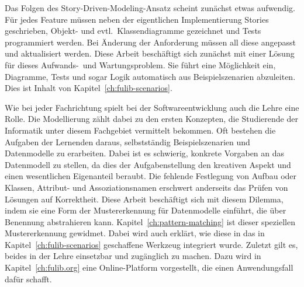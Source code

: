 Das Folgen des Story-Driven-Modeling-Ansatz scheint zunächst etwas aufwendig.
Für jedes Feature müssen neben der eigentlichen Implementierung Stories geschrieben, Objekt- und evtl.\ Klassendiagramme gezeichnet und Tests programmiert werden.
Bei Änderung der Anforderung müssen all diese angepasst und aktualisiert werden.
Diese Arbeit beschäftigt sich zunächst mit einer Lösung für dieses Aufwands-\ und Wartungsproblem.
Sie führt eine Möglichkeit ein, Diagramme, Tests und sogar Logik automatisch aus Beispielszenarien abzuleiten.
Dies ist Inhalt von Kapitel~\ref{ch:fulib-scenarios}.

Wie bei jeder Fachrichtung spielt bei der Softwareentwicklung auch die Lehre eine Rolle.
Die Modellierung zählt dabei zu den ersten Konzepten, die Studierende der Informatik unter diesem Fachgebiet vermittelt bekommen.
Oft bestehen die Aufgaben der Lernenden daraus, selbstständig Beispielszenarien und Datenmodelle zu erarbeiten.
Dabei ist es schwierig, konkrete Vorgaben an das Datenmodell zu stellen, da dies der Aufgabenstellung den kreativen Aspekt und einen wesentlichen Eigenanteil beraubt.
Die fehlende Festlegung von Aufbau oder Klassen, Attribut- und Assoziationsnamen erschwert anderseits das Prüfen von Lösungen auf Korrektheit.
Diese Arbeit beschäftigt sich mit diesem Dilemma, indem sie eine Form der Mustererkennung für Datenmodelle einführt, die über Benennung abstrahieren kann.
Kapitel~\ref{ch:pattern-matching} ist dieser speziellen Mustererkennung gewidmet.
Dabei wird auch erklärt, wie diese in das in Kapitel~\ref{ch:fulib-scenarios} geschaffene Werkzeug integriert wurde.
Zuletzt gilt es, beides in der Lehre einsetzbar und zugänglich zu machen.
Dazu wird in Kapitel~\ref{ch:fulib.org} eine Online-Platform vorgestellt, die einen Anwendungsfall dafür schafft.
